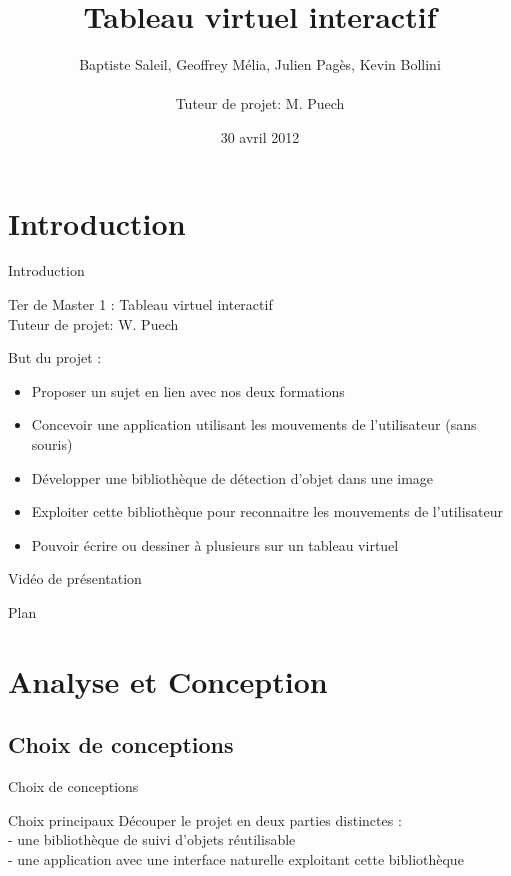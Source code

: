 \documentclass{beamer}
\title{Tableau virtuel interactif}
\author{Baptiste Saleil, Geoffrey Mélia, Julien Pagès, Kevin Bollini \\ \ \\Tuteur de projet: M. Puech}
\date{30 avril 2012}
\begin{document}
	\begin{frame}
		\titlepage
	\end{frame}

	\section{Introduction}
		\begin{frame}{Introduction}
		\begin{center}
		\LARGE{Ter de Master 1 : Tableau virtuel interactif} \\
		\large{Tuteur de projet: W. Puech}
		\end{center}
		
		But du projet :
		\begin{itemize}
      \item Proposer un sujet en lien avec nos deux formations
		\item Concevoir une application utilisant les mouvements de l'utilisateur (sans souris)
		\item Développer une bibliothèque de détection d'objet dans une image
		\item Exploiter cette bibliothèque pour reconnaitre les mouvements de l'utilisateur
		\item Pouvoir écrire ou dessiner à plusieurs sur un tableau virtuel
		\end{itemize}
		
		\end{frame}

	\begin{frame}{Vidéo de présentation}
	\end{frame}

	\begin{frame}{Plan}
		\tableofcontents
	\end{frame}
		
	\section{Analyse et Conception}
	\subsection{Choix de conceptions}
		\begin{frame}{Choix de conceptions}
			\begin{block}{Choix principaux}
				Découper le projet en deux parties distinctes : \\
				- une bibliothèque de suivi d'objets réutilisable \\
				- une application avec une interface naturelle exploitant cette bibliothèque \\
			\end{block}
		\end{frame}
		
\end{document}
